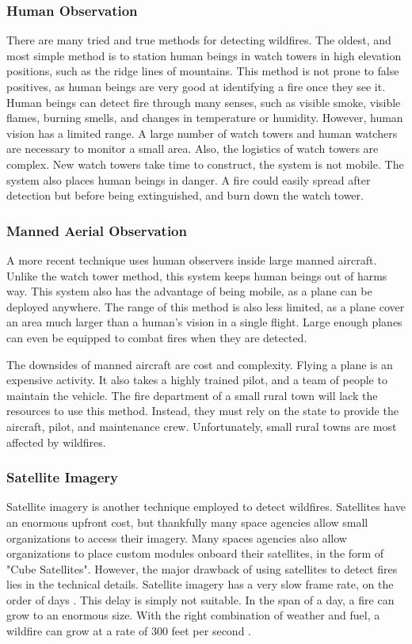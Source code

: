 \documentclass[12pt,journal,compsoc]{IEEEtran}
\begin{document}
\subsubsection{Human Observation}
There are many tried and true methods for detecting wildfires. The oldest, and most simple method is to station human beings in watch towers in high elevation positions, such as the ridge lines of mountains. This method is not prone to false positives, as human beings are very good at identifying a fire once they see it. Human beings can detect fire through many senses, such as visible smoke, visible flames, burning smells, and changes in temperature or humidity. However, human vision has a limited range. A large number of watch towers and human watchers are necessary to monitor a small area. Also, the logistics of watch towers are complex. New watch towers take time to construct, the system is not mobile. The system also places human beings in danger. A fire could easily spread after detection but before being extinguished, and burn down the watch tower. 

\subsubsection{Manned Aerial Observation}
A more recent technique uses human observers inside large manned aircraft. Unlike the watch tower method, this system keeps human beings out of harms way. This system also has the advantage of being mobile, as a plane can be deployed anywhere. The range of this method is also less limited, as a plane cover an area much larger than a human's vision in a single flight. Large enough planes can even be equipped to combat fires when they are detected. 

The downsides of manned aircraft are cost and complexity. Flying a plane is an expensive activity. It also takes a highly trained pilot, and a team of people to maintain the vehicle. The fire department of a small rural town will lack the resources to use this method. Instead, they must rely on the state to provide the aircraft, pilot, and maintenance crew. Unfortunately, small rural towns are most affected by wildfires. 

\subsubsection{Satellite Imagery}
Satellite imagery is another technique employed to detect wildfires. Satellites have an enormous upfront cost, but thankfully many space agencies allow small organizations to access their imagery. Many spaces agencies also allow organizations to place custom modules onboard their satellites, in the form of "Cube Satellites". However, the major drawback of using satellites to detect fires lies in the technical details. Satellite imagery has a very slow frame rate, on the order of days \cite{technique_review}. This delay is simply not suitable. In the span of a day, a fire can grow to an enormous size. With the right combination of weather and fuel, a wildfire can grow at a rate of 300 feet per second \cite{climate_and_wildfire}.
\end{document}
